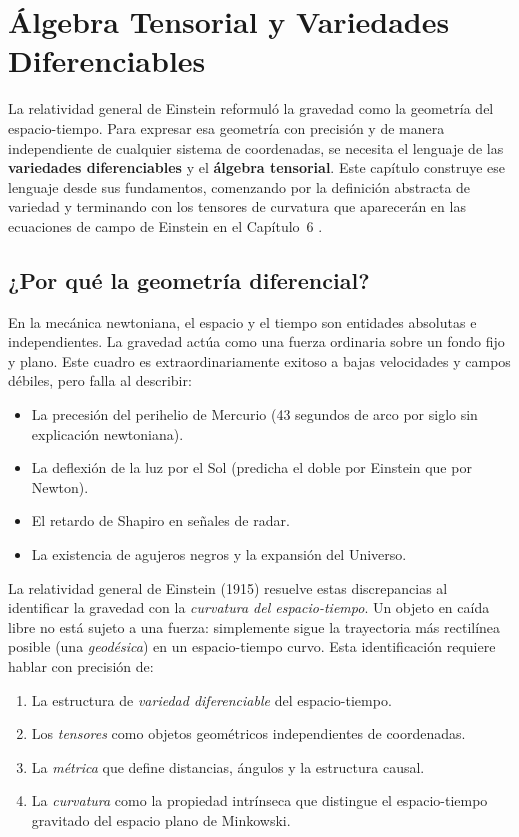 \chapter{Álgebra Tensorial y Variedades Diferenciables}

La relatividad general de Einstein reformuló la gravedad como la geometría del espacio-tiempo. Para expresar esa geometría con precisión y de manera independiente de cualquier sistema de coordenadas, se necesita el lenguaje de las \textbf{variedades diferenciables} y el \textbf{álgebra tensorial}. Este capítulo construye ese lenguaje desde sus fundamentos, comenzando por la definición abstracta de variedad y terminando con los tensores de curvatura que aparecerán en las ecuaciones de campo de Einstein en el Capítulo~6 \cite{Carroll2004,Wald1984,Misner1973}.

\section{¿Por qué la geometría diferencial?}

En la mecánica newtoniana, el espacio y el tiempo son entidades absolutas e independientes. La gravedad actúa como una fuerza ordinaria sobre un fondo fijo y plano. Este cuadro es extraordinariamente exitoso a bajas velocidades y campos débiles, pero falla al describir:

\begin{itemize}
  \item La precesión del perihelio de Mercurio (43 segundos de arco por siglo sin explicación newtoniana).
  \item La deflexión de la luz por el Sol (predicha el doble por Einstein que por Newton).
  \item El retardo de Shapiro en señales de radar.
  \item La existencia de agujeros negros y la expansión del Universo.
\end{itemize}

La relatividad general de Einstein (1915) resuelve estas discrepancias al identificar la gravedad con la \emph{curvatura del espacio-tiempo}. Un objeto en caída libre no está sujeto a una fuerza: simplemente sigue la trayectoria más rectilínea posible (una \emph{geodésica}) en un espacio-tiempo curvo. Esta identificación requiere hablar con precisión de:

\begin{enumerate}[leftmargin=2em, label=\textbf{\arabic*.}]
  \item La estructura de \emph{variedad diferenciable} del espacio-tiempo.
  \item Los \emph{tensores} como objetos geométricos independientes de coordenadas.
  \item La \emph{métrica} que define distancias, ángulos y la estructura causal.
  \item La \emph{curvatura} como la propiedad intrínseca que distingue el espacio-tiempo gravitado del espacio plano de Minkowski.
\end{enumerate}

